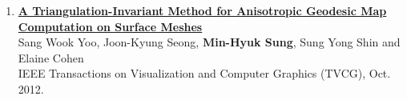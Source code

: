 \documentclass[letterpaper,10pt]{article} %
\newcommand{\blankline}{\quad\pagebreak[2]}
\begin{document}
{\begin{enumerate}
\item \label{tvcg12}
\href{http://dx.doi.org/10.1109/TVCG.2012.29}{\textbf{A Triangulation-Invariant Method for Anisotropic Geodesic Map Computation on Surface Meshes}} \\
Sang Wook Yoo, Joon-Kyung Seong, \textbf{Min-Hyuk Sung}, Sung Yong Shin and Elaine Cohen\\
IEEE Transactions on Visualization and Computer Graphics (TVCG), Oct. 2012.\\
\blankline

%
%
%


\end{enumerate}}
\end{document}
